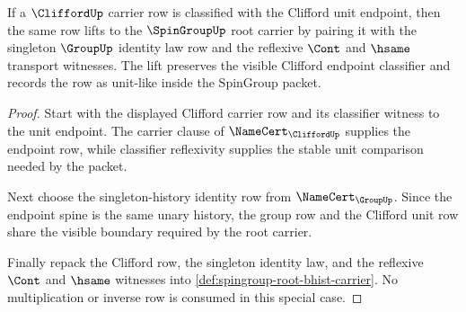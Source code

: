 
\begin{theorem}
\label{thm:spingroup-root-clifford-unit-lift}
If a $\CliffordUp$ carrier row is classified with the Clifford unit endpoint, then the same row lifts to the $\SpinGroupUp$ root carrier by pairing it with the singleton $\GroupUp$ identity law row and the reflexive $\Cont$ and $\hsame$ transport witnesses. The lift preserves the visible Clifford endpoint classifier and records the row as unit-like inside the SpinGroup packet.
\end{theorem}
\begin{proof}
Start with the displayed Clifford carrier row and its classifier witness to the unit endpoint. The carrier clause of $\NameCert_{\CliffordUp}$ supplies the endpoint row, while classifier reflexivity supplies the stable unit comparison needed by the packet.

Next choose the singleton-history identity row from $\NameCert_{\GroupUp}$. Since the endpoint spine is the same unary history, the group row and the Clifford unit row share the visible boundary required by the root carrier.

Finally repack the Clifford row, the singleton identity law, and the reflexive $\Cont$ and $\hsame$ witnesses into \autoref{def:spingroup-root-bhist-carrier}. No multiplication or inverse row is consumed in this special case.
\end{proof}


